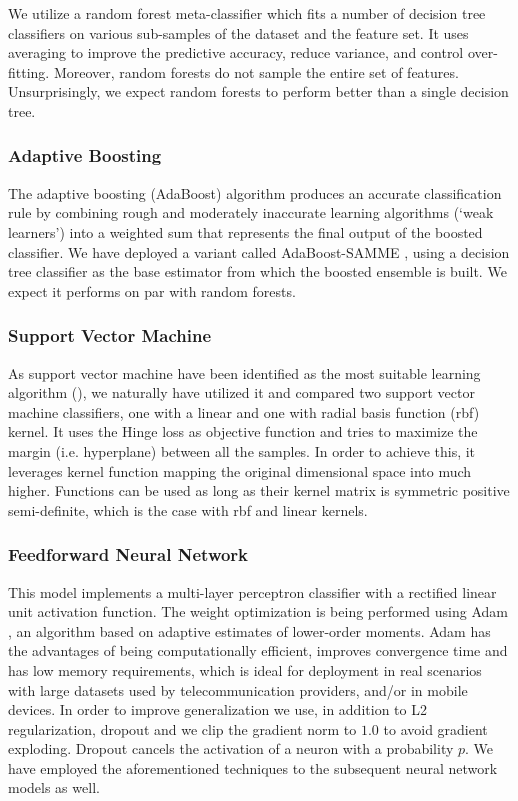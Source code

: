 \documentclass[letterpaper]{article}
\begin{document}
We utilize a random forest meta-classifier which fits a number of decision tree classifiers on various sub-samples of the dataset and the feature set. It uses averaging to improve the predictive accuracy, reduce variance, and control over-fitting. Moreover, random forests do not sample the entire set of features. Unsurprisingly, we expect random forests to perform better than a single decision tree.

\subsubsection{Adaptive Boosting}  \label{Adaptive Boosting}

The adaptive boosting (AdaBoost) algorithm \cite{freund1997decision} produces an accurate classification rule by combining rough and moderately inaccurate learning algorithms (`weak learners') into a weighted sum that represents the final output of the boosted classifier. We have deployed a variant called AdaBoost-SAMME \cite{hastie2009multi}, using a decision tree classifier as the base estimator from which the boosted ensemble is built. We expect it performs on par with random forests. 

\subsubsection{Support Vector Machine}  \label{Support Vector Machine}

As support vector machine have been identified as the most suitable learning algorithm (\cite{yang1999evaluation}), we naturally have utilized it and compared two support vector machine classifiers, one with a linear and one with radial basis function (rbf) kernel. It uses the Hinge loss as objective function and tries to maximize the margin (i.e. hyperplane) between all the samples. In order to achieve this, it leverages kernel function mapping the original dimensional space into much higher. Functions can be used as long as their kernel matrix is symmetric positive semi-definite, which is the case with rbf and linear kernels.

\subsubsection{Feedforward Neural Network}  \label{Feedforward Neural Network}

This model implements a multi-layer perceptron classifier with a rectified linear unit activation function. The weight optimization is being performed using Adam \cite{DBLP:journals/corr/KingmaB14}, an algorithm based on adaptive estimates of lower-order moments. Adam has the advantages of being computationally efficient, improves convergence time and has low memory requirements, which is ideal for deployment in real scenarios with large datasets used by telecommunication providers, and/or in mobile devices. In order to improve generalization we use, in addition to L2 regularization, dropout \cite{Srivastava2014} and we clip the gradient norm to $1.0$ to avoid gradient exploding. Dropout cancels the activation of a neuron with a probability $p$. We have employed the aforementioned techniques to the subsequent neural network models as well.
\end{document}
